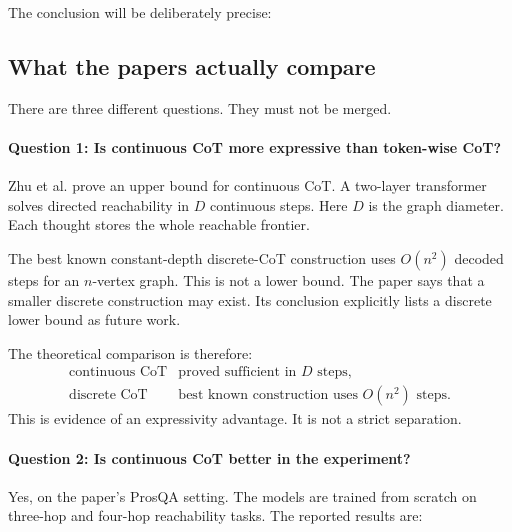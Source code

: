 \documentclass[11pt]{article}
\theoremstyle{definition}
\begin{document}
The conclusion will be deliberately precise:

\begin{center}
\end{center}

\subsection{What the papers actually compare}

There are three different questions. They must not be merged.

\paragraph{Question 1: Is continuous CoT more expressive than token-wise CoT?} Zhu et al. prove an upper bound for continuous CoT. A two-layer transformer solves directed reachability in $D$ continuous steps. Here $D$ is the graph diameter. Each thought stores the whole reachable frontier.

The best known constant-depth discrete-CoT construction uses $O(n^2)$ decoded steps for an $n$-vertex graph. This is not a lower bound. The paper says that a smaller discrete construction may exist. Its conclusion explicitly lists a discrete lower bound as future work.

The theoretical comparison is therefore:
\[
\begin{array}{ll}
\text{continuous CoT} & \text{proved sufficient in }D\text{ steps},\\
\text{discrete CoT} & \text{best known construction uses }O(n^2)\text{ steps}.
\end{array}
\tag{3.6a}
\]
This is evidence of an expressivity advantage. It is not a strict separation.

\paragraph{Question 2: Is continuous CoT better in the experiment?} Yes, on the paper's ProsQA setting. The models are trained from scratch on three-hop and four-hop reachability tasks. The reported results are:
\end{document}
